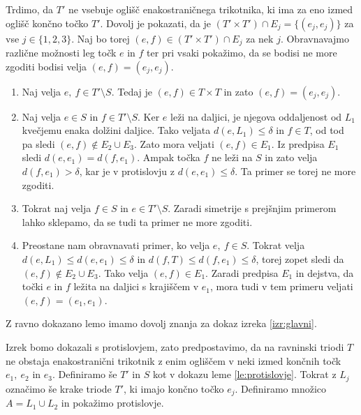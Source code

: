\documentclass[mat1]{fmfdelo}
\begin{document}
Trdimo, da $T'$ ne vsebuje oglišč enakostraničnega trikotnika, ki ima za eno izmed oglišč končno točko $T'$. Dovolj je pokazati, da je $(T' \times T') \cap E_j = \{(e_j, e_j)\}$ za vse $j \in \{1, 2, 3\}$. Naj bo torej $(e, f) \in (T' \times T') \cap E_j$ za nek $j$. Obravnavajmo različne možnosti leg točk $e$ in $f$ ter pri vsaki pokažimo, da se bodisi ne more zgoditi bodisi velja $(e, f) = (e_j, e_j)$.
\begin{enumerate}
\item Naj velja $e,\ f \in T' \setminus S$. Tedaj je $(e, f) \in T \times T$ in zato $(e, f) = (e_j, e_j)$.
\item Naj velja $e \in S$ in $f \in T' \setminus S$. Ker $e$ leži na daljici, je njegova oddaljenost od $L_1$ kvečjemu enaka dolžini daljice. Tako veljata $d(e, L_1)\leq \delta$ in $f \in T$, od tod pa sledi $(e, f) \notin E_2 \cup E_3$. Zato mora veljati $(e, f) \in E_1$. Iz predpisa $E_1$ sledi $d(e, e_1) = d(f, e_1)$. Ampak točka $f$ ne leži na $S$ in zato velja $d(f, e_1) > \delta$, kar je v protislovju z $d(e, e_1) \leq \delta$. Ta primer se torej ne more zgoditi.
\item Tokrat naj velja $f \in S$ in $e \in T' \setminus S$. Zaradi simetrije s prejšnjim primerom lahko sklepamo, da se tudi ta primer ne more zgoditi.
\item Preostane nam obravnavati primer, ko velja $e,\ f \in S$. Tokrat velja $d(e, L_1) \leq d(e, e_1) \leq \delta$ in $d(f, T) \leq d(f, e_1) \leq \delta$, torej zopet sledi da $(e, f) \notin E_2 \cup E_3$. Tako velja $(e, f) \in E_1$. Zaradi predpisa $E_1$ in dejstva, da točki $e$ in $f$ ležita na daljici s krajiščem v $e_1$, mora tudi v tem primeru veljati $(e, f) = (e_1, e_1)$.
\end{enumerate}
\endproof

Z ravno dokazano lemo imamo dovolj znanja za dokaz izreka \ref{izr:glavni}.

Izrek bomo dokazali s protislovjem, zato predpostavimo, da na ravninski triodi $T$ ne obstaja enakostranični trikotnik z enim ogliščem v neki izmed končnih točk $e_1,\ e_2$ in $e_3$. Definiramo še $T'$ in $S$ kot v dokazu leme \ref{le:protislovje}. Tokrat z $L_j$ označimo še krake triode $T'$, ki imajo končno točko $e_j$. Definiramo množico $A = L_1 \cup L_2$ in pokažimo protislovje.

\begin{center}
\end{center}
\end{document}
